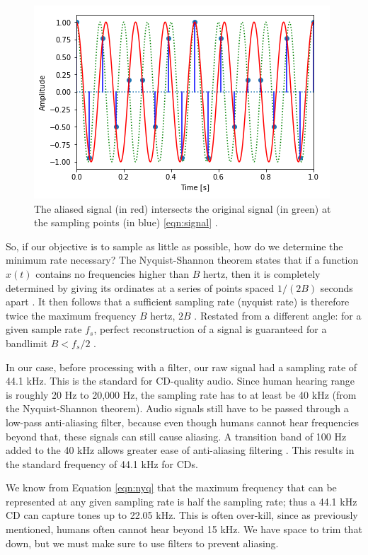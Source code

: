 \begin{figure}[H]
	\centering
	\includegraphics[scale = 1]{aliased_curve.png} %
	
 \caption{
	The aliased signal (in red) intersects the original
 	signal (in green) at the sampling points (in blue)
	\ref{eqn:signal} \cite{notebook:sampling}.
	} 
 	\label{fig:aliase}  
 \end{figure}

So, if our objective is to sample as little as possible, how do
we determine the minimum rate necessary? The Nyquist-Shannon theorem states that if a function $x ( t )$ contains no
frequencies higher than $B$ hertz, then it is completely determined by
giving its ordinates at a series of points spaced $1 / ( 2 B )$
seconds apart \cite{shannon:wiki}. It then follows that a sufficient sampling rate (nyquist rate) is therefore twice the maximum frequency $B$ hertz, $2B$ \cite{shannon:wiki}.
Restated from a different angle: for a given sample rate $f_{s}$, perfect reconstruction of a signal is guaranteed for a bandlimit $B<f_{s}/2$ \cite{shannon:wiki}.


In our case, before processing with a filter, our raw signal had
a sampling rate of 44.1 kHz. This is the standard for CD-quality
audio. Since human hearing range is roughly 20 Hz to 20,000 Hz, the sampling rate has to at least be 40 kHz (from the Nyquist-Shannon theorem). Audio signals still have to be passed through a low-pass anti-aliasing filter, because even though humans cannot hear frequencies beyond that, these signals can still cause aliasing. A transition band of 100 Hz added to the 40 kHz allows greater ease of anti-aliasing filtering \cite{cd:wiki}. This results in the standard frequency of 44.1 kHz for CDs.



We know from Equation \ref{eqn:nyq} that the maximum
frequency that can be represented at any given sampling rate is
half the sampling rate; thus a 44.1 kHz CD can capture tones up
to 22.05 kHz. This is often over-kill, since as previously
mentioned, humans often cannot hear beyond 15 kHz. We have space
to trim that down, but we must make sure to use filters to
prevent aliasing.

